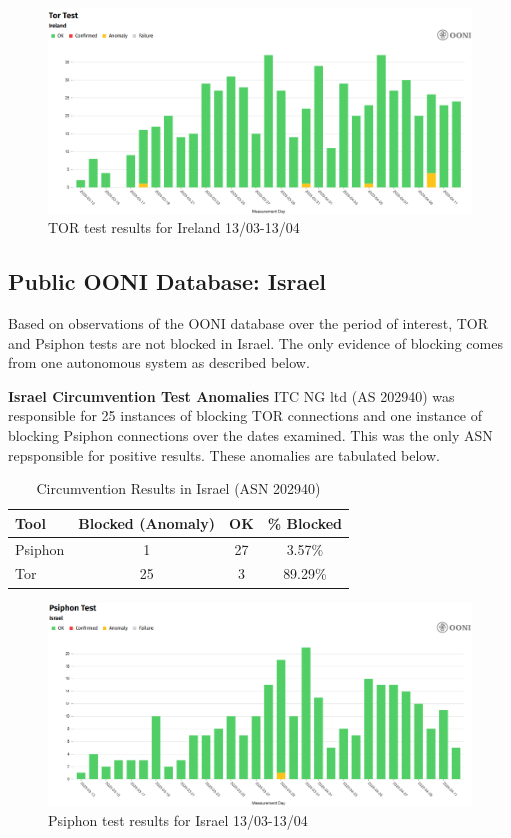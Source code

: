 \begin{figure} [H]
    \centering
    \includegraphics[width=0.5\linewidth]{IREDBTOR.png}
    \caption{TOR test results for Ireland 13/03-13/04}
    \label{fig:enter-label}
\end{figure}

\subsection{Public OONI Database: Israel}

Based on observations of the OONI database over the period of interest, TOR and Psiphon tests are not blocked in Israel. The only evidence of blocking comes from one autonomous system as described below.

\textbf{Israel Circumvention Test Anomalies}
ITC NG ltd (AS 202940) was responsible for 25 instances of blocking TOR connections and one instance of blocking Psiphon connections over the dates examined. This was the only ASN repsponsible for positive results. These anomalies are tabulated below.

\begin{table}[H]
\centering
\caption{Circumvention Results in Israel (ASN 202940)}
\begin{tabular}{lccc}
\toprule
\textbf{Tool} & \textbf{Blocked (Anomaly)} & \textbf{OK} & \textbf{\% Blocked} \\
\midrule
Psiphon & 1  & 27 & 3.57\% \\
Tor     & 25 & 3  & 89.29\% \\
\bottomrule
\end{tabular}
\label{tab:circumvention_israel}
\end{table}


\begin{figure} [H]
    \centering
    \includegraphics[width=0.5\linewidth]{ISROONIPSI.png}
    \caption{Psiphon test results for Israel 13/03-13/04}
    \label{fig:enter-label}
\end{figure}

